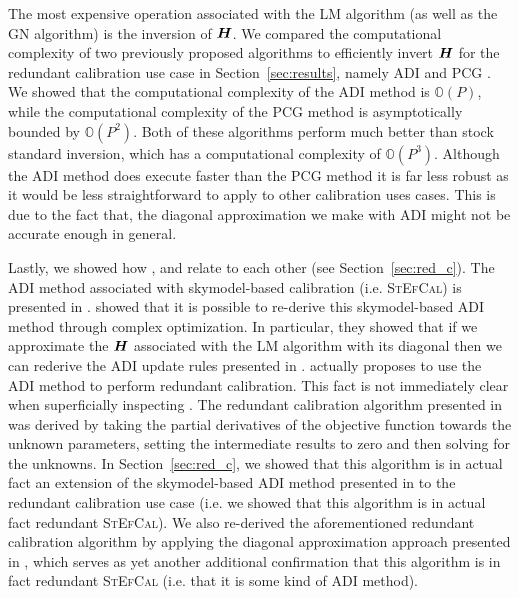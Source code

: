 \documentclass[useAMS,usenatbib]{mn2e}
\newcommand{\bH}{\bmath{H}}
\begin{document}
The most expensive operation associated with the LM algorithm (as well as the GN algorithm) is the inversion of $\bH$.
We compared the computational complexity of two previously proposed algorithms to efficiently invert $\bH$ for the redundant calibration use case in Section~\ref{sec:results}, namely 
ADI \citep{Marthi2014} and PCG \citep{Liu2010}. We showed that the computational complexity of the ADI method is $\mathbb{O}(P)$, while the computational complexity of the PCG method is asymptotically bounded
by $\mathbb{O}(P^2)$. Both of these algorithms perform much better than stock standard inversion, which has a computational complexity of $\mathbb{O}(P^3)$.
Although the ADI method does execute faster than the PCG method it is far less robust as it would be less straightforward to apply to other calibration uses cases. This is due to the fact that,
the diagonal approximation we make with ADI might not be accurate enough in general.

Lastly, we showed how \citet{Marthi2014}, \citet{Salvini2014} and \citet{Smirnov2015} relate to each other (see Section~\ref{sec:red_c}). The ADI method associated with skymodel-based calibration (i.e. \textsc{StEfCal}) is presented
in \citet{Salvini2014}. \citet{Smirnov2015} showed that it is possible to re-derive this skymodel-based ADI method through complex optimization. In particular, they showed that if 
we approximate the $\bH$ associated with the LM algorithm with its diagonal then we can rederive the ADI update rules presented in \citet{Salvini2014}. 
\citet{Marthi2014} actually proposes to use the ADI method to perform redundant calibration. This fact is not immediately clear when superficially inspecting \citet{Marthi2014}. The redundant calibration algorithm presented in \citet{Marthi2014} was derived by taking the partial derivatives of 
the objective function towards the unknown parameters, setting the intermediate results to zero and then solving for the unknowns. In Section~\ref{sec:red_c}, we showed that 
this algorithm is in actual fact an extension of the skymodel-based ADI method presented in \citet{Salvini2014} to the redundant calibration use case (i.e. we showed that this algorithm is in actual fact redundant \textsc{StEfCal}).
We also re-derived the aforementioned redundant calibration algorithm by applying the diagonal approximation approach presented in \citet{Smirnov2015}, which serves as yet another additional confirmation  
that this algorithm is in fact redundant \textsc{StEfCal} (i.e. that it is some kind of ADI method).
\end{document}
